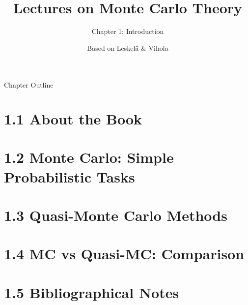 \documentclass[aspectratio=169,10pt]{beamer}
\title[MC Theory -- Ch.1]{Lectures on Monte Carlo Theory}
\subtitle{Chapter 1: Introduction}
\author{Based on Leskel\"{a} \& Vihola}
\date{}
\begin{document}
\begin{frame}
  \titlepage
\end{frame}

\begin{frame}{Chapter Outline}
  \tableofcontents
\end{frame}

\section{1.1 About the Book}
\section{1.2 Monte Carlo: Simple Probabilistic Tasks}
\section{1.3 Quasi-Monte Carlo Methods}
\section{1.4 MC vs Quasi-MC: Comparison}
\section{1.5 Bibliographical Notes}
\end{document}

